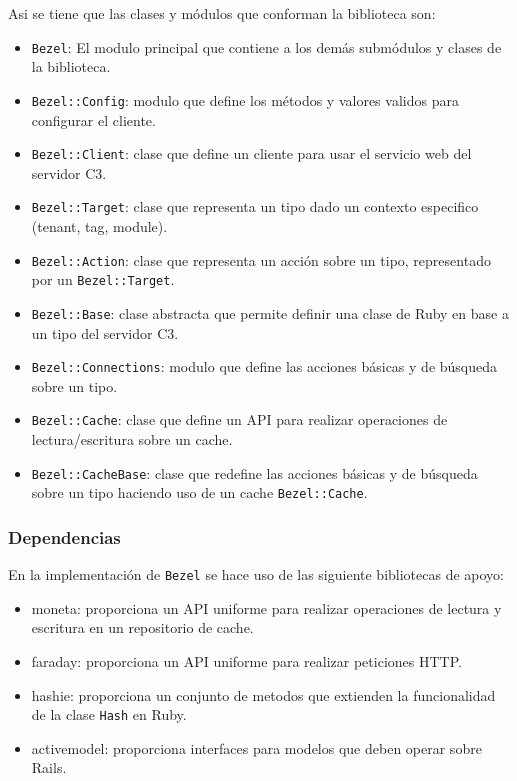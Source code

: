 Asi se tiene que las clases y módulos que conforman la biblioteca son:
\begin{itemize}
\item \texttt{Bezel}: El modulo principal que contiene a los demás submódulos y
  clases de la biblioteca.
\item \texttt{Bezel::Config}: modulo que define los métodos y valores validos
  para configurar el cliente.
\item \texttt{Bezel::Client}: clase que define un cliente para usar el servicio
  web del servidor C3.
\item \texttt{Bezel::Target}: clase que representa un tipo dado un contexto
  especifico (tenant, tag, module).
\item \texttt{Bezel::Action}: clase que representa un acción sobre
  un tipo, representado por un \texttt{Bezel::Target}.
\item \texttt{Bezel::Base}: clase abstracta que permite definir una clase de Ruby
  en base a un tipo del servidor C3.
\item \texttt{Bezel::Connections}: modulo que define las acciones básicas y de
  búsqueda sobre un tipo.
\item \texttt{Bezel::Cache}: clase que define un API para realizar operaciones
  de lectura/escritura sobre un cache.
\item \texttt{Bezel::CacheBase}: clase que redefine las acciones básicas y
  de búsqueda sobre un tipo haciendo uso de un cache \texttt{Bezel::Cache}.
\end{itemize}


\subsubsection{Dependencias}

En la implementación de \texttt{Bezel} se hace uso de las siguiente bibliotecas
de apoyo:

\begin{itemize}
\item moneta: proporciona un API uniforme para realizar
  operaciones de lectura y escritura en un repositorio de cache.
\item faraday: proporciona un API uniforme para realizar
  peticiones HTTP.
\item hashie: proporciona un conjunto de metodos que extienden la funcionalidad
  de la clase \texttt{Hash} en Ruby.
\item activemodel: proporciona interfaces para modelos que deben operar sobre
  Rails.
\end{itemize}

